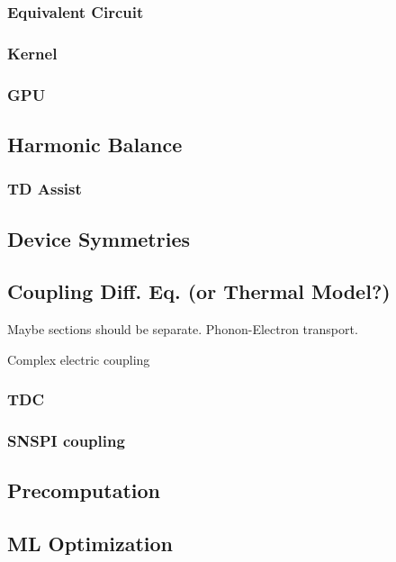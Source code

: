\documentclass{article}
\begin{document}
\subsubsection{Equivalent Circuit}

\subsubsection{Kernel}

\subsubsection{GPU}

\subsection{Harmonic Balance}

\subsubsection{TD Assist}

\subsection{Device Symmetries}

\subsection{Coupling Diff. Eq. (or Thermal Model?)}

Maybe sections should be separate. Phonon-Electron transport.

Complex electric coupling

\subsubsection{TDC}

\subsubsection{SNSPI coupling}

\subsection{Precomputation}

\subsection{ML Optimization}
\end{document}
